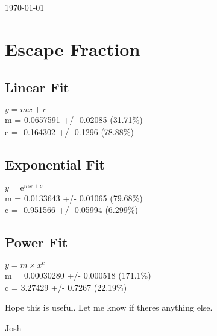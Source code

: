 \documentclass{article}
\begin{document}
\small{\today}
\section{Escape Fraction}
	\subsection{Linear Fit}
		\begin{minipage}[h]{0.6\textwidth}
				\begin{center}
					\begingroup{}
		  			\resizebox{\textwidth}{!}{%
						
		  			}\endgroup
				\end{center}
		\end{minipage}
		\begin{minipage}[h]{0.35\textwidth}
			$y=mx+c$ \\
			m               = 0.0657591        +/- 0.02085      (31.71\%) \\
			c               = -0.164302        +/- 0.1296       (78.88\%) \\
		\end{minipage}

	\subsection{Exponential Fit}
		\begin{minipage}[h]{0.6\textwidth}
				\begin{center}
					\begingroup{}
		  			\resizebox{\textwidth}{!}{%
						
		  			}\endgroup
				\end{center}
		\end{minipage}
		\begin{minipage}[h]{0.35\textwidth}
			$y = \textrm{e}^{mx + c}$ \\
			m               = 0.0133643        +/- 0.01065      (79.68\%) \\
			c               = -0.951566        +/- 0.05994      (6.299\%) \\
		\end{minipage}

	\subsection{Power Fit}
		\begin{minipage}[h]{0.6\textwidth}
				\begin{center}
					\begingroup{}
		  			\resizebox{\textwidth}{!}{%
						
		  			}\endgroup
				\end{center}
		\end{minipage}
		\begin{minipage}[h]{0.35\textwidth}
			$y = m\times x^c$ \\
			m               = 0.00030280      +/- 0.000518    (171.1\%) \\
			c               = 3.27429          +/- 0.7267       (22.19\%) \\
		\end{minipage}

		Hope this is useful. Let me know if theres anything else.

		Josh
\end{document}
